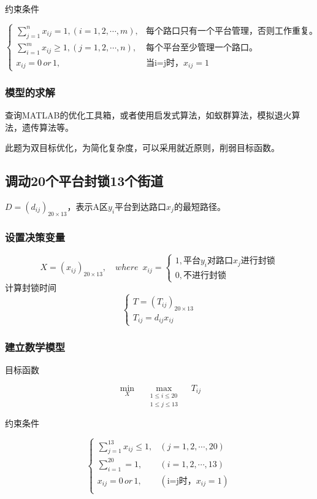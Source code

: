 {\heiti 约束条件}\par
\begin{equation*}
\begin{cases}
\sum_{j=1}^{n}x_{ij}=1,(i=1,2,\cdots,m), &\text{每个路口只有一个平台管理，否则工作重复。} \\
\sum_{i=1}^{m}x_{ij}\geq 1,(j=1,2,\cdots,n), &\text{每个平台至少管理一个路口。} \\
x_{ij}=0\,or\,1, &\text{当i=j时，$x_{ij}=1$}
\end{cases}
\end{equation*}
\subsubsection{模型的求解}
查询MATLAB的优化工具箱，或者使用启发式算法，如蚁群算法，模拟退火算法，遗传算法等。\par
此题为双目标优化，为简化复杂度，可以采用就近原则，削弱目标函数。

\subsection{调动20个平台封锁13个街道}
$D=(d_{ij})_{20\times 13}$，表示A区$y_i$平台到达路口$x_j$的最短路径。
\subsubsection{设置决策变量}
\begin{equation*}
X = (x_{ij})_{20\times 13},\quad where\,\,\,x_{ij}=
\begin{cases}
1, \text{平台$y_i$对路口$x_j$进行封锁} \\
0, \text{不进行封锁}
\end{cases}
\end{equation*}
计算封锁时间
\begin{equation*}
\begin{cases}
T = (T_{ij})_{20\times 13} \\
T_{ij} = d_{ij}x_{ij}
\end{cases}
\end{equation*}
\subsubsection{建立数学模型}
{\heiti 目标函数}\par
$$\min_{X}\quad\max_{\substack{1\leq i\leq 20 \\ 1\leq j\leq 13}}\quad T_{ij}$$

{\heiti 约束条件}\par
\begin{equation*}
\begin{cases}
\sum_{j=1}^{13}x_{ij}\leq 1, &(j=1,2,\cdots,20) \\
\sum_{i=1}^{20}=1, &(i=1,2,\cdots,13) \\
x_{ij}=0 \,or\, 1, &(\text{i=j时，$x_{ij}=1$})\\
\end{cases}
\end{equation*}

